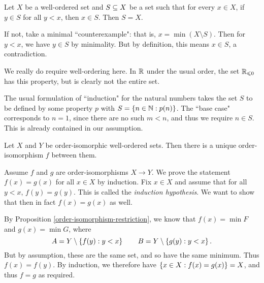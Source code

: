 \documentclass{article}
\begin{document}
\begin{proposition}
    Let $X$ be a well-ordered set and $S \subseteq X$ be a set such that for every $x \in X$, if $y \in S$ for all $y < x$, then $x \in S$. Then $S = X$.
\end{proposition}

\begin{prf}
    If not, take a minimal ``counterexample": that is, $x = \min(X \setminus S)$. Then for $y < x$, we have $y \in S$ by minimality. But by definition, this means $x \in S$, a contradiction.
\end{prf}

\begin{note}
	We really do require well-ordering here. In $\mathbb{R}$ under the usual order, the set $\mathbb{R}_{\leqslant 0}$ has this property, but is clearly not the entire set.
\end{note}

\begin{note}
	The usual formulation of ``induction" for the natural numbers takes the set $S$ to be defined by some property $p$ with $S = \left\lbrace n \in \mathbb{N}  : p(n) \right\rbrace$. The ``base case" corresponds to $n = 1$, since there are no such $m < n$, and thus we require $n \in S$. This is already contained in our assumption.
\end{note}

\begin{proposition}
	\label{unique-order-isomorphism}
    Let $X$ and $Y$ be order-isomorphic well-ordered sets. Then there is a unique order-isomorphism $f$ between them.
\end{proposition}

\begin{prf}
    Assume $f$ and $g$ are order-isomorphisms $X \to Y$. We prove the statement $f(x) = g(x)$ for all $x \in X$ by induction. Fix $x \in X$ and assume that for all $y < x$, $f(y) = g(y)$. This is called the \textit{induction hypothesis}. We want to show that then in fact $f(x) = g(x)$ as well.
    
    By Proposition \ref{order-isomorphism-restriction}, we know that $f(x) = \min F$ and $g(x) = \min G$, where  
    \[
	A = Y \setminus \left\lbrace f(y) : y < x \right\rbrace \qquad B = Y \setminus \left\lbrace g(y) : y < x \right\rbrace.
	\]
	But by assumption, these are the same set, and so have the same minimum. Thus $f(x) = f(y)$. By induction, we therefore have $\left\lbrace x \in X: f(x) = g(x) \right\rbrace = X$, and thus $f = g$ as required.
\end{prf}
\end{document}
